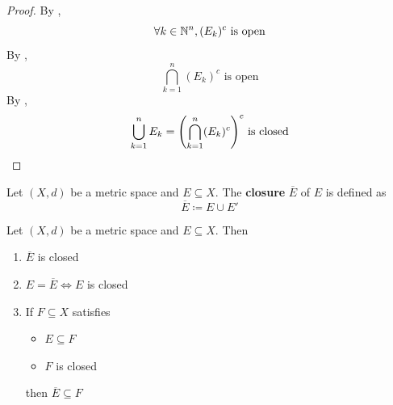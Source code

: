 \begin{proof}
    By ,
    \[
    \forall k \in \mathbb{N}^{n}, (E_{k})^{c} \text{ is open}
    \]
    By ,
    \[
    \bigcap_{k = 1}^{n} (E_{k})^{c} \text{ is open}
    \]
    By ,
    \[
    \bigcup_{k = 1}^{n} E_{k} = \paren*{\bigcap_{k = 1}^{n} (E_{k})^{c}}^{c} \text{ is closed}
    \]
\end{proof}

\bigskip

\begin{definition} \label{an:def:closure}
    Let $(X, d)$ be a metric space and $E \subseteq X$. The \textbf{closure} $\overline{E}$ of $E$ is defined as
    \[
    \overline{E} \coloneqq E \cup E'
    \]
\end{definition}

\bigskip

\begin{theorem} \label{an:thm:properties-of-closure}
    Let $(X, d)$ be a metric space and $E \subseteq X$. Then
    \begin{enumerate}[label=\textbf{(\Alph*)}]
        \item $\overline{E}$ is closed
        \item $E = \overline{E} \iff E$ is closed
        \item If $F \subseteq X$ satisfies
        \begin{itemize}
            \item $E \subseteq F$
            \item $F$ is closed
        \end{itemize}
        then $\overline{E} \subseteq F$
    \end{enumerate}
\end{theorem}

